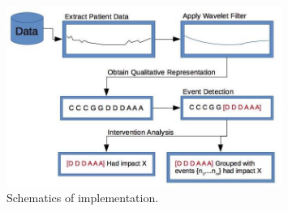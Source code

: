\begin{figure}[ht!]
  \centering
  \includegraphics[width=0.8\textwidth]{images/flowchart.jpg}
  \caption[]
  {\small Schematics of implementation.}
  \label{fig:flowchart}
\end{figure}
